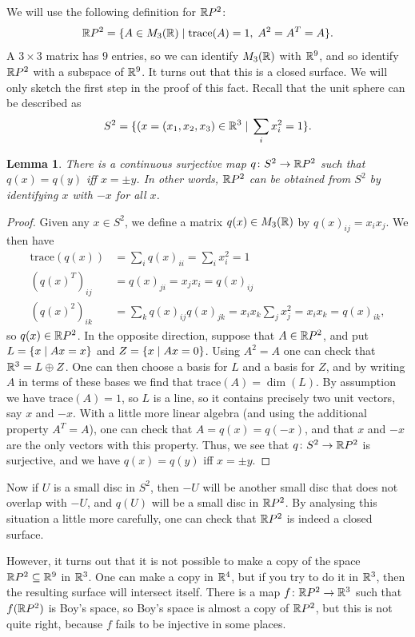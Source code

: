 \documentclass[reqno]{amsart}
\newtheorem{lemma}[theorem]{Lemma}
\theoremstyle{definition}
\begin{document}
We will use the following definition for $\mathbb{R} P^2$:
\[ \mathbb{R} P^2 = \{A\in M_3(\mathbb{R})\;|\; \text{trace}(A)=1,\; A^2=A^T=A\}. \]
A $3\times 3$ matrix has $9$ entries, so we can identify $M_3(\mathbb{R})$
with $\mathbb{R}^9$, and so identify $\mathbb{R} P^2$ with a subspace of $\mathbb{R}^9$.  It
turns out that this is a closed surface.  We will only sketch the
first step in the proof of this fact.  Recall that the unit sphere can
be described as
\[ S^2 = \{(x=(x_1,x_2,x_3)\in \mathbb{R}^3 \;|\; \sum_ix_i^2 = 1\}. \]
\begin{lemma}\label{lem-proj-plane}
 There is a continuous surjective map $q\colon S^2\to\mathbb{R} P^2$ such that
 $q(x)=q(y)$ iff $x=\pm y$.  In other words, $\mathbb{R} P^2$ can be obtained
 from $S^2$ by identifying $x$ with $-x$ for all $x$.
\end{lemma}
\begin{proof}
 Given any $x\in S^2$, we define a matrix $q(x)\in M_3(\mathbb{R})$ by
 $q(x)_{ij}=x_ix_j$.  We then have
 \begin{align*}
  \text{trace}(q(x)) &= \sum_i q(x)_{ii} = \sum_i x_i^2 = 1 \\
  (q(x)^T)_{ij} &= q(x)_{ji} = x_jx_i = q(x)_{ij} \\
  (q(x)^2)_{ik} &= \sum_k q(x)_{ij}q(x)_{jk}
   = x_i x_k \sum_j x_j^2 = x_ix_k = q(x)_{ik},
 \end{align*}
 so $q(x)\in\mathbb{R} P^2$.  In the opposite direction, suppose that
 $A\in\mathbb{R} P^2$, and put $L=\{x\;|\; Ax=x\}$ and $Z=\{x\;|\; Ax=0\}$.  Using
 $A^2=A$ one can check that $\mathbb{R}^3=L\oplus Z$.  One can then choose a
 basis for $L$ and a basis for $Z$, and by writing $A$ in terms of
 these bases we find that $\text{trace}(A)=\dim(L)$.  By assumption we
 have $\text{trace}(A)=1$, so $L$ is a line, so it contains precisely
 two unit vectors, say $x$ and $-x$.  With a little more linear
 algebra (and using the additional property $A^T=A$), one can check
 that $A=q(x)=q(-x)$, and that $x$ and $-x$ are the only vectors with
 this property.  Thus, we see that $q\colon S^2\to\mathbb{R} P^2$ is surjective,
 and we have $q(x)=q(y)$ iff $x=\pm y$. 
\end{proof}
Now if $U$ is a small disc in $S^2$, then $-U$ will be
another small disc that does not overlap with $-U$, and $q(U)$ will be
a small disc in $\mathbb{R} P^2$.  By analysing this situation a little more
carefully, one can check that $\mathbb{R} P^2$ is indeed a closed surface.

However, it turns out that it is not possible to make a copy of 
the space $\mathbb{R} P^2\subseteq\mathbb{R}^9$ in $\mathbb{R}^3$.  One can make a copy in $\mathbb{R}^4$,
but if you try to do it in $\mathbb{R}^3$, then the resulting surface will
intersect itself.  There is a map $f\colon\mathbb{R} P^2\to \mathbb{R}^3$ such that 
$f(\mathbb{R} P^2)$ is Boy's space, so Boy's space is almost a copy of 
$\mathbb{R} P^2$, but this is not quite right, because $f$ fails to be
injective in some places.
\end{document}
